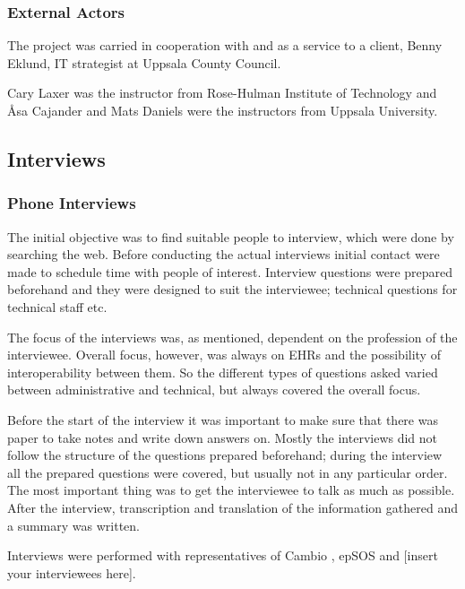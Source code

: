 \documentclass[14pt]{article}
\begin{document}
\subsubsection{External Actors}
The project was carried in cooperation with and as a service to a client, Benny Eklund, IT strategist at Uppsala County Council.

Cary Laxer was the instructor from Rose-Hulman Institute of Technology and Åsa Cajander and Mats Daniels were the instructors from Uppsala University.

\subsection{Interviews}

\subsubsection{Phone Interviews}

The initial objective was to find suitable people to interview, which were done by searching the web. Before conducting the actual interviews initial contact were made to schedule time with people of interest. Interview questions were prepared  beforehand and they were designed to suit the interviewee; technical questions for technical staff etc. 

The focus of the interviews was, as mentioned, dependent on the profession of the interviewee. Overall focus, however, was always on \glspl{EHR} and the possibility of interoperability between them. So the different types of questions asked varied between administrative and technical, but always covered the overall focus. 

Before the start of the interview it was important to make sure that there was paper to take notes and write down answers on. Mostly the interviews did not follow the structure of the questions prepared beforehand; during the interview all the prepared questions were covered, but usually not in any particular order. The most important thing was to get the interviewee to talk as much as possible. After the interview, transcription and translation of the information gathered and a summary was written.

Interviews were performed with representatives of Cambio \cite{Cambio}, epSOS \cite{epSOS} and [insert your interviewees here].
\end{document}
